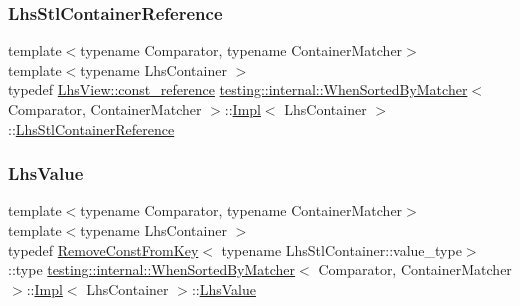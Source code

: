 \mbox{\label{classtesting_1_1internal_1_1_when_sorted_by_matcher_1_1_impl_ab5e53a762bb213ccf84299b31c825b58}} 
\subsubsection{\texorpdfstring{Lhs\+Stl\+Container\+Reference}{LhsStlContainerReference}}
{\footnotesize\ttfamily template$<$typename Comparator, typename Container\+Matcher$>$ \\
template$<$typename Lhs\+Container $>$ \\
typedef \hyperlink{classtesting_1_1internal_1_1_stl_container_view_a9cd4f6ed689b3938cdb7b3c4cbf1b36b}{Lhs\+View\+::const\+\_\+reference} \hyperlink{classtesting_1_1internal_1_1_when_sorted_by_matcher}{testing\+::internal\+::\+When\+Sorted\+By\+Matcher}$<$ Comparator, Container\+Matcher $>$\+::\hyperlink{classtesting_1_1internal_1_1_when_sorted_by_matcher_1_1_impl}{Impl}$<$ Lhs\+Container $>$\+::\hyperlink{classtesting_1_1internal_1_1_when_sorted_by_matcher_1_1_impl_ab5e53a762bb213ccf84299b31c825b58}{Lhs\+Stl\+Container\+Reference}}

\mbox{\label{classtesting_1_1internal_1_1_when_sorted_by_matcher_1_1_impl_a93044f4ba53373fcfc424132b5e6c462}} 
\subsubsection{\texorpdfstring{Lhs\+Value}{LhsValue}}
{\footnotesize\ttfamily template$<$typename Comparator, typename Container\+Matcher$>$ \\
template$<$typename Lhs\+Container $>$ \\
typedef \hyperlink{structtesting_1_1internal_1_1_remove_const_from_key}{Remove\+Const\+From\+Key}$<$ typename Lhs\+Stl\+Container\+::value\+\_\+type$>$\+::type \hyperlink{classtesting_1_1internal_1_1_when_sorted_by_matcher}{testing\+::internal\+::\+When\+Sorted\+By\+Matcher}$<$ Comparator, Container\+Matcher $>$\+::\hyperlink{classtesting_1_1internal_1_1_when_sorted_by_matcher_1_1_impl}{Impl}$<$ Lhs\+Container $>$\+::\hyperlink{classtesting_1_1internal_1_1_when_sorted_by_matcher_1_1_impl_a93044f4ba53373fcfc424132b5e6c462}{Lhs\+Value}}

